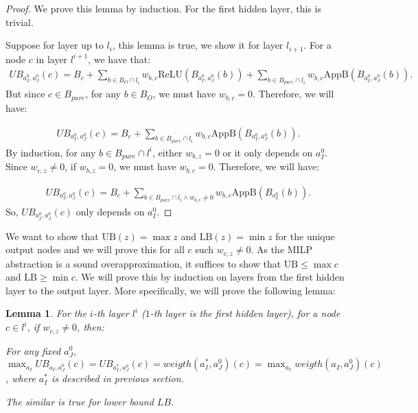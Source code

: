 \documentclass[]{article}
\newtheorem{lemma}{Lemma}
\theoremstyle{definition}
\newcommand{\ReLU}{\mathrm{ReLU}}
\begin{document}
\begin{proof}
	We prove this lemma by induction. For the first hidden layer, this is trivial.
	
	Suppose for layer up to $l_i$, this lemma is true, we show it for layer $l_{i+1}$. For a node $c$ in layer $l^{i+1}$, we have that: \begin{align*}
		UB_{a^0_I,a^0_J}(c) = B_c + \sum_{b\in B_O\cap l_i} w_{b,c}\ReLU(B_{a^0_I,a^0_J}(b)) + \sum_{b\in B_{pure}\cap l_{i}} w_{b,c} \mathrm{AppB}(B_{a^0_I,a^0_J}(b)).
	\end{align*} But since $c\in B_{pure}$, for any $b\in B_O$, we must have $w_{b,c}=0$. Therefore, we will have:
	
	\begin{align*}
		UB_{a^0_I,a^0_J}(c) = B_c + \sum_{b\in B_{pure}\cap l_{i}} w_{b,c} \mathrm{AppB}(B_{a^0_I,a^0_J}(b)).
	\end{align*} By induction, for any $b\in B_{pure}\cap l^i$, either $w_{b,z}=0$ or it only depends on $a^0_I$. Since $w_{c,z}\neq 0$, if $w_{b,z}=0$, we must have $w_{b,c}=0$. Therefore, we will have:
	
	\begin{align*}
		UB_{a^0_I,a^0_J}(c) = B_c + \sum_{b\in B_{pure}\cap l_{i}\wedge w_{b,c}\neq0} w_{b,c} \mathrm{AppB}(B_{a^0_I}(b)).
	\end{align*} So, $UB_{a^0_I,a^0_J}(c)$ only depends on $a_I^0$.
\end{proof}


We want to show that $\mathrm{UB}(z) = \max z$ and $\mathrm{LB}(z) = \min z$ for the unique output nodes and we will prove this for all $c$ such $w_{c,z}\neq 0$. As the MILP abstraction is a sound overapproximation, 
it suffices to show that $\mathrm{UB}\leq \max c$ and $\mathrm{LB} \geq \min c$. We will prove this by induction on layers from the first hidden layer to the output layer. More specifically, we will prove the following lemma:

\begin{lemma}
	For the $i$-th layer $l^i$ ($1$-th layer is the first hidden layer), for a node $c\in l^i$, if $w_{c,z}\neq 0$, then:
	
	 For any fixed $a^0_J$, $\max_{a_I} UB_{a_I,a^0_J}(c)=UB_{a^*_I,a^0_J}(c)= weigth(a^*_I,a^0_J)(c) = \max_{a_I} weigth(a_I,a^0_J)(c)$, where $a^*_I$ is described in previous section.
	
The similar is true for lower bound $LB$.
\end{lemma}
\end{document}
